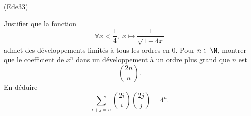 \begin{tiny}(Ede33)\end{tiny} Justifier que la fonction 
\[
  \forall x < \frac{1}{4}, \; x\mapsto \frac{1}{\sqrt{1 - 4x}}
\]
admet des développements limités à tous les ordres en $0$. Pour $n \in \N$, montrer que le coefficient de $x^n$ dans un développement à un ordre plus grand que $n$ est 
\[
  \binom{2n}{n}.
\]
En déduire
\[
  \sum_{ i + j = n}\binom{2i}{i} \binom{2j}{j} = 4^n.
\]
